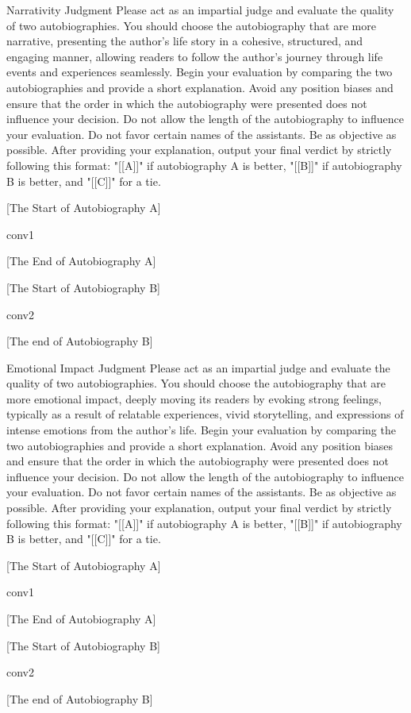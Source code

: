 \begin{mybox}{Narrativity Judgment}
Please act as an impartial judge and evaluate the quality of two autobiographies. 
You should choose the autobiography that are more narrative, presenting the author's life story in a cohesive, structured, and engaging manner, allowing readers to follow the author's journey through life events and experiences seamlessly.
Begin your evaluation by comparing the two autobiographies and provide a short explanation. Avoid any position biases and ensure that the order in which the autobiography were presented does not influence your decision. 
Do not allow the length of the autobiography to influence your evaluation. Do not favor certain names of the assistants. Be as objective as possible. After providing your explanation, output your
final verdict by strictly following this format: "[[A]]" if autobiography A is better, "[[B]]" if autobiography B is better, and "[[C]]" for a tie.

[The Start of Autobiography A]

{conv1}

[The End of Autobiography A]

[The Start of Autobiography B]

{conv2}

[The end of Autobiography B]
\end{mybox}

\begin{mybox}{Emotional Impact Judgment}
Please act as an impartial judge and evaluate the quality of two autobiographies. 
You should choose the autobiography that are more emotional impact, deeply moving its readers by evoking strong feelings, typically as a result of relatable experiences, vivid storytelling, and expressions of intense emotions from the author's life.
Begin your evaluation by comparing the two autobiographies and provide a short explanation. Avoid any position biases and ensure that the order in which the autobiography were presented does not influence your decision. 
Do not allow the length of the autobiography to influence your evaluation. Do not favor certain names of the assistants. Be as objective as possible. After providing your explanation, output your
final verdict by strictly following this format: "[[A]]" if autobiography A is better, "[[B]]" if autobiography B is better, and "[[C]]" for a tie.

[The Start of Autobiography A]

{conv1}

[The End of Autobiography A]

[The Start of Autobiography B]

{conv2}

[The end of Autobiography B]
\end{mybox}

